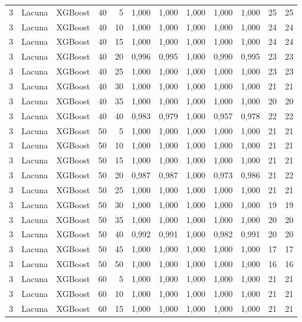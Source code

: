 \begin{longtable}{@{}rllrrrrrrrrr@{}}
3 & Lacuna & XGBoost & 40 & 5 & 1,000 & 1,000 & 1,000 & 1,000 & 1,000 & 25 & 25 \\
3 & Lacuna & XGBoost & 40 & 10 & 1,000 & 1,000 & 1,000 & 1,000 & 1,000 & 24 & 24 \\
3 & Lacuna & XGBoost & 40 & 15 & 1,000 & 1,000 & 1,000 & 1,000 & 1,000 & 24 & 24 \\
3 & Lacuna & XGBoost & 40 & 20 & 0,996 & 0,995 & 1,000 & 0,990 & 0,995 & 23 & 23 \\
3 & Lacuna & XGBoost & 40 & 25 & 1,000 & 1,000 & 1,000 & 1,000 & 1,000 & 23 & 23 \\
3 & Lacuna & XGBoost & 40 & 30 & 1,000 & 1,000 & 1,000 & 1,000 & 1,000 & 21 & 21 \\
3 & Lacuna & XGBoost & 40 & 35 & 1,000 & 1,000 & 1,000 & 1,000 & 1,000 & 20 & 20 \\
3 & Lacuna & XGBoost & 40 & 40 & 0,983 & 0,979 & 1,000 & 0,957 & 0,978 & 22 & 22 \\
3 & Lacuna & XGBoost & 50 & 5 & 1,000 & 1,000 & 1,000 & 1,000 & 1,000 & 21 & 21 \\
3 & Lacuna & XGBoost & 50 & 10 & 1,000 & 1,000 & 1,000 & 1,000 & 1,000 & 21 & 21 \\
3 & Lacuna & XGBoost & 50 & 15 & 1,000 & 1,000 & 1,000 & 1,000 & 1,000 & 21 & 21 \\
3 & Lacuna & XGBoost & 50 & 20 & 0,987 & 0,987 & 1,000 & 0,973 & 0,986 & 21 & 22 \\
3 & Lacuna & XGBoost & 50 & 25 & 1,000 & 1,000 & 1,000 & 1,000 & 1,000 & 21 & 21 \\
3 & Lacuna & XGBoost & 50 & 30 & 1,000 & 1,000 & 1,000 & 1,000 & 1,000 & 19 & 19 \\
3 & Lacuna & XGBoost & 50 & 35 & 1,000 & 1,000 & 1,000 & 1,000 & 1,000 & 20 & 20 \\
3 & Lacuna & XGBoost & 50 & 40 & 0,992 & 0,991 & 1,000 & 0,982 & 0,991 & 20 & 20 \\
3 & Lacuna & XGBoost & 50 & 45 & 1,000 & 1,000 & 1,000 & 1,000 & 1,000 & 17 & 17 \\
3 & Lacuna & XGBoost & 50 & 50 & 1,000 & 1,000 & 1,000 & 1,000 & 1,000 & 16 & 16 \\
3 & Lacuna & XGBoost & 60 & 5 & 1,000 & 1,000 & 1,000 & 1,000 & 1,000 & 21 & 21 \\
3 & Lacuna & XGBoost & 60 & 10 & 1,000 & 1,000 & 1,000 & 1,000 & 1,000 & 21 & 21 \\
3 & Lacuna & XGBoost & 60 & 15 & 1,000 & 1,000 & 1,000 & 1,000 & 1,000 & 21 & 21 \\

\end{longtable}

